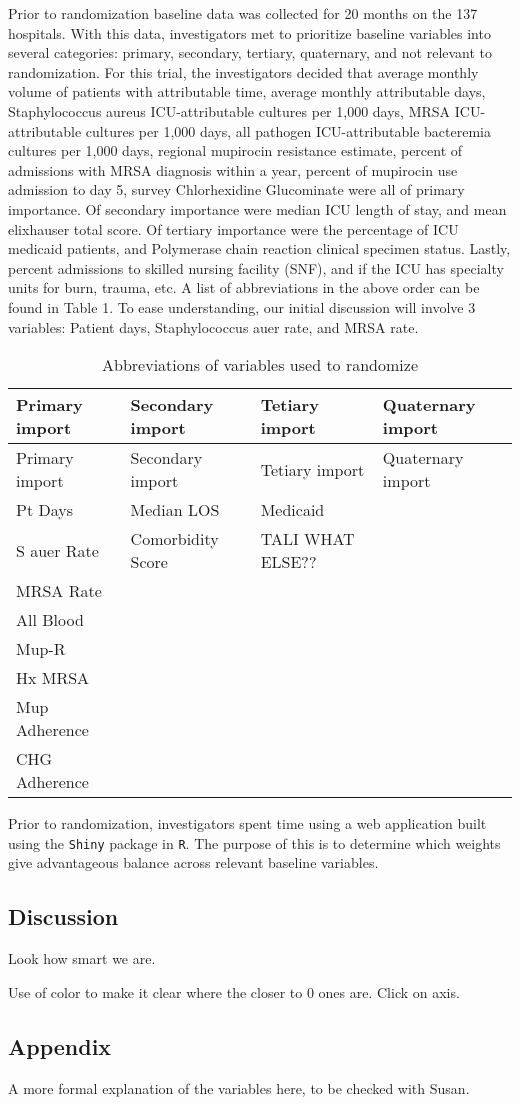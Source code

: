 \documentclass[]{sagej}
\begin{document}
Prior to randomization baseline data was collected for 20 months on the
137 hospitals. With this data, investigators met to prioritize baseline
variables into several categories: primary, secondary, tertiary,
quaternary, and not relevant to randomization. For this trial, the
investigators decided that average monthly volume of patients with
attributable time, average monthly attributable days, Staphylococcus
aureus ICU-attributable cultures per 1,000 days, MRSA ICU-attributable
cultures per 1,000 days, all pathogen ICU-attributable bacteremia
cultures per 1,000 days, regional mupirocin resistance estimate, percent
of admissions with MRSA diagnosis within a year, percent of mupirocin
use admission to day 5, survey Chlorhexidine Glucominate were all of
primary importance. Of secondary importance were median ICU length of
stay, and mean elixhauser total score. Of tertiary importance were the
percentage of ICU medicaid patients, and Polymerase chain reaction
clinical specimen status. Lastly, percent admissions to skilled nursing
facility (SNF), and if the ICU has specialty units for burn, trauma,
etc. A list of abbreviations in the above order can be found in Table 1.
To ease understanding, our initial discussion will involve 3 variables:
Patient days, Staphylococcus auer rate, and MRSA rate.

\begin{longtable}[]{@{}llll@{}}
\caption{Abbreviations of variables used to randomize}\tabularnewline
\toprule
Primary import & Secondary import & Tetiary import & Quaternary
import\tabularnewline
\midrule
\endfirsthead
\toprule
Primary import & Secondary import & Tetiary import & Quaternary
import\tabularnewline
\midrule
\endhead
Pt Days & Median LOS & Medicaid\tabularnewline
S auer Rate & Comorbidity Score & TALI WHAT ELSE??\tabularnewline
MRSA Rate &\tabularnewline
All Blood &\tabularnewline
Mup-R &\tabularnewline
Hx MRSA &\tabularnewline
Mup Adherence &\tabularnewline
CHG Adherence &\tabularnewline
\bottomrule
\end{longtable}

Prior to randomization, investigators spent time using a web application
built using the \texttt{Shiny} package in \texttt{R}. The purpose of
this is to determine which weights give advantageous balance across
relevant baseline variables.

\subsection{Discussion}\label{discussion}

Look how smart we are.

Use of color to make it clear where the closer to 0 ones are. Click on
axis.

\subsection{Appendix}\label{appendix}

A more formal explanation of the variables here, to be checked with
Susan.


\end{document}
